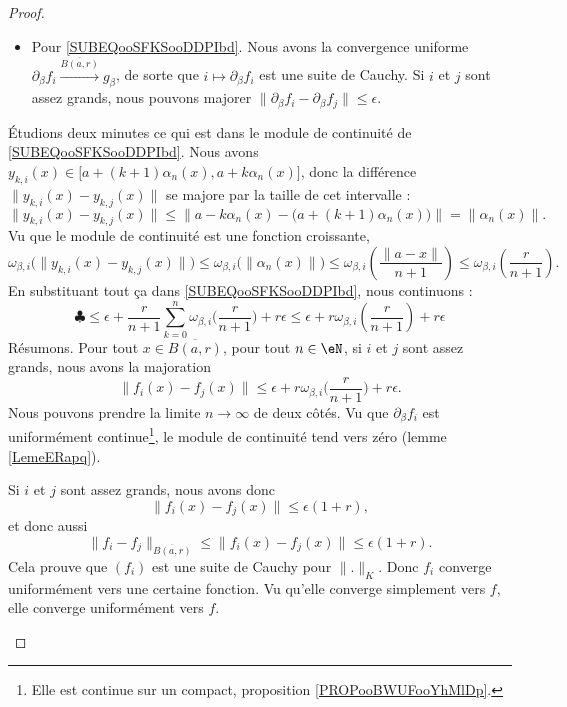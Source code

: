 \begin{proof}
\begin{subproof}
\begin{itemize}
			\item Pour \eqref{SUBEQooSFKSooDDPIbd}. Nous avons la convergence uniforme \( \partial_{\beta}f_i\stackrel{\overline{ B(a,r) }}{\longrightarrow}g_{\beta}\), de sorte que \( i\mapsto \partial_{\beta}f_i\) est une suite de Cauchy. Si \( i\) et \( j\) sont assez grands, nous pouvons majorer \( \| \partial_{\beta}f_i-\partial_{\beta}f_j \|\leq \epsilon\).
		\end{itemize}
		Étudions deux minutes ce qui est dans le module de continuité de \eqref{SUBEQooSFKSooDDPIbd}. Nous avons \( y_{k,i}(x)\in\mathopen\big[ a+(k+1)\alpha_n(x) , a+k\alpha_n(x) \mathclose]\), donc la différence \( \| y_{k,i}(x)-y_{k,j}(x) \|\) se majore par la taille de cet intervalle :
		\begin{equation}
			\| y_{k,i}(x)-y_{k,j}(x) \|\leq \| a-k\alpha_n(x)-\big( a+(k+1)\alpha_n(x) \big) \|=\| \alpha_n(x) \|.
		\end{equation}
		Vu que le module de continuité est une fonction croissante,
		\begin{equation}
			\omega_{\beta,i}\big( \| y_{k,i}(x)-y_{k,j}(x) \| \big)\leq \omega_{\beta,i}\big( \| \alpha_n(x) \| \big)\leq \omega_{\beta,i}\left( \frac{ \| a-x \| }{ n+1 } \right)\leq \omega_{\beta,i}\left( \frac{ r }{ n+1 } \right).
		\end{equation}
		En substituant tout ça dans \eqref{SUBEQooSFKSooDDPIbd}, nous continuons :
		\begin{equation}
			\clubsuit\leq \epsilon+\frac{ r }{ n+1 }\sum_{k=0}^n\omega_{\beta,i}\big(  \frac{ r }{ n+1 }  \big)+r\epsilon
			\leq \epsilon+r\omega_{\beta,i}\left( \frac{ r }{ n+1 } \right)+r\epsilon
		\end{equation}
		Résumons. Pour tout \( x\in \overline{ B(a,r) }\), pour tout \( n\in \eN\), si \( i\) et \( j\) sont assez grands, nous avons la majoration
		\begin{equation}
			\| f_i(x)-f_j(x) \|\leq \epsilon+r\omega_{\beta,i}\big( \frac{ r }{ n+1 } \big)+r\epsilon.
		\end{equation}
		Nous pouvons prendre la limite \( n\to \infty\) de deux côtés. Vu que \( \partial_{\beta}f_i\) est uniformément continue\footnote{Elle est continue sur un compact, proposition \ref{PROPooBWUFooYhMlDp}.}, le module de continuité tend vers zéro (lemme \ref{LemeERapq}).

		Si \( i\) et \( j\) sont assez grands, nous avons donc
		\begin{equation}
			\| f_i(x)-f_j(x) \|\leq \epsilon(1+r),
		\end{equation}
		et donc aussi
		\begin{equation}
			\| f_i-f_j \|_{\overline{ B(a,r) }}\leq \| f_i(x)-f_j(x) \|\leq \epsilon(1+r).
		\end{equation}
		Cela prouve que \( (f_i)\) est une suite de Cauchy pour \( \| . \|_K\). Donc \( f_i\) converge uniformément vers une certaine fonction. Vu qu'elle converge simplement vers \( f\), elle converge uniformément vers \( f\).


\end{subproof}
\end{proof}
